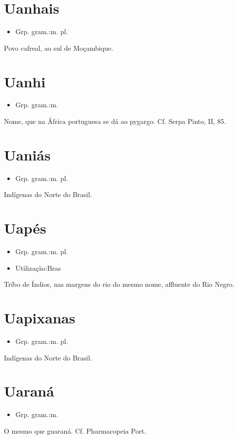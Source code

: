 \documentclass{article}
\begin{document}
\section{Uanhais}
\begin{itemize}
\item {Grp. gram.:m. pl.}
\end{itemize}
Povo cafreal, ao sul de Moçambique.
\section{Uanhi}
\begin{itemize}
\item {Grp. gram.:m.}
\end{itemize}
Nome, que na África portuguesa se dá ao pygargo. Cf. Serpa Pinto, II, 85.
\section{Uaniás}
\begin{itemize}
\item {Grp. gram.:m. pl.}
\end{itemize}
Indígenas do Norte do Brasil.
\section{Uapés}
\begin{itemize}
\item {Grp. gram.:m. pl.}
\end{itemize}
\begin{itemize}
\item {Utilização:Bras}
\end{itemize}
Tríbo de Índios, nas margens do rio do mesmo nome, affluente do Rio Negro.
\section{Uapixanas}
\begin{itemize}
\item {Grp. gram.:m. pl.}
\end{itemize}
Indígenas do Norte do Brasil.
\section{Uaraná}
\begin{itemize}
\item {Grp. gram.:m.}
\end{itemize}
O mesmo que \textunderscore guaraná\textunderscore . Cf. \textunderscore Pharmacopeia Port.\textunderscore 
\end{document}

